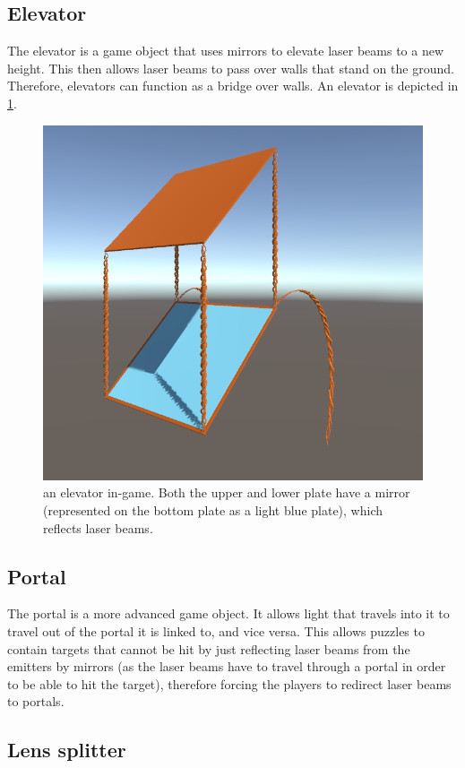 		\subsection{Elevator} \label{ssec:elevator}
			The elevator is a game object that uses mirrors to elevate laser beams
			to a new height. This then allows laser beams to pass over walls that 
			stand on the ground. Therefore, elevators can function as a bridge over
			walls. An elevator is depicted in \ref{fig:elevator}.
			\begin{figure}[h!]
				\centering
				\includegraphics[scale = 0.3]{Elevator}
				\caption{an elevator in-game. Both the upper and lower plate have a
				mirror (represented on the bottom plate as a light blue plate),
				which reflects laser beams.}
				\label{fig:elevator}
			\end{figure}
		\subsection{Portal}
			The portal is a more advanced game object. It allows light that travels 
			into it to travel out of the portal it is linked to, and vice versa. This
			allows puzzles to contain targets that cannot be hit by just reflecting
			laser beams from the emitters by mirrors (as the laser beams have to
			travel through a portal in order to be able to hit the target),
			therefore forcing the players to redirect laser beams to portals.
		\subsection{Lens splitter}